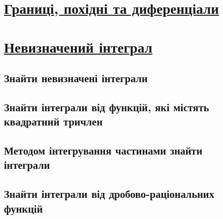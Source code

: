 \documentclass[a4paper, 12pt, oneside]{extreport}
\begin{document}


\chapter{\underline{Границі, похідні та диференціали}}






\chapter{\underline{Невизначений інтеграл}}

\section*{Знайти невизначені інтеграли}


\section*{Знайти інтеграли від функцій, які містять квадратний тричлен}


\section*{Методом інтегрування частинами знайти інтеграли}

\setcounter{subsection}{13}

\section*{Знайти інтеграли від дробово-раціональних функцій}
\end{document}
